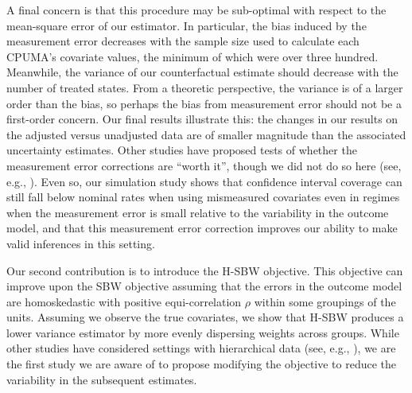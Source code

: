 \documentclass[aoas]{imsart}
\theoremstyle{plain}
\theoremstyle{remark}
\begin{document}
A final concern is that this procedure may be sub-optimal with respect to the mean-square error of our estimator. In particular, the bias induced by the measurement error decreases with the sample size used to calculate each CPUMA's covariate values, the minimum of which were over three hundred. Meanwhile, the variance of our counterfactual estimate should decrease with the number of treated states. From a theoretic perspective, the variance is of a larger order than the bias, so perhaps the bias from measurement error should not be a first-order concern. Our final results illustrate this: the changes in our results on the adjusted versus unadjusted data are of smaller magnitude than the associated uncertainty estimates. Other studies have proposed tests of whether the measurement error corrections are ``worth it'', though we did not do so here (see, e.g., \cite{gleser1992importance}). Even so, our simulation study shows that confidence interval coverage can still fall below nominal rates when using mismeasured covariates even in regimes when the measurement error is small relative to the variability in the outcome model, and that this measurement error correction improves our ability to make valid inferences in this setting.

Our second contribution is to introduce the H-SBW objective. This objective can improve upon the SBW objective assuming that the errors in the outcome model are homoskedastic with positive equi-correlation $\rho$ within some groupings of the units. Assuming we observe the true covariates, we show that H-SBW produces a lower variance estimator by more evenly dispersing weights across groups. While other studies have considered settings with hierarchical data (see, e.g., \cite{keele2020hospital}), we are the first study we are aware of to propose modifying the objective to reduce the variability in the subsequent estimates.
\end{document}
